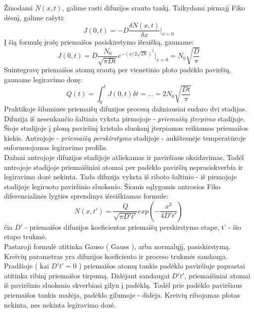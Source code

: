 \documentclass[11pt,a4paper]{article}
\begin{document}
Žinodami $N(x,t)$, galime rasti difuzijos srauto tankį. Taikydami pirmajį Fiko dėsnį, galime rašyti:
\begin{equation} 
J(0,t) = - D\frac{\delta N(x,t)}{\delta x}|_{x=0}
\end{equation}
Į šią formulę įrašę priemaišos pasiskirstymo išraišką, gauname:
\begin{equation}
J(0,t) = D\frac{N_0}{\sqrt{\pi Dt}} e^{-(x/2\sqrt{Dt})^{2}}|_{x=0} = N_0 \sqrt{\frac{D}{\pi}}
\end{equation}
Suintegravę priemaišos atomų srautą per vienetinio ploto padėklo paviršių, gauname legiravimo dozę:
\begin{equation}
Q(t) = \int^{t}_{0}J(0,t)\delta t = ... = 2N_0 \sqrt{\frac{Dt}{\pi}} 
\end{equation}
Praktikoje šiluminės priemaišų difuzijos procesą dažniausiai sudaro dvi stadijas. Difuzija iš nesenkančio šaltinio vyksta pirmojoje - \emph{priemaišų įterpimo} stadijoje. Šioje stadijoje į ploną paviršinį kristalo sluoksnį įterpiamas reikiamas priemaišos kiekis. Antrojoje - \emph{priemaišų perskirstymo} stadijoje - aukštesnėje temperatūroje suformuojamas legiravimo profilis.\\

Dažnai antrojoje difuzijos stadijoje atliekamas ir paviršiaus oksidavimas. Todėl antrojoje stadijoje priemaišiniai atomai per padėklo paviršių neprasiskverbia ir legiravimo dozė nekinta. Tada difuzija vyksta iš riboto šaltinio - iš pirmojoje stadijoje legiruoto paviršinio sluoksnio. Šiomis sąlygomis antrosios Fiko diferencialinės lygties sprendinys išreiškiamas formule:
\begin{equation}
N(x,t') = \frac{Q}{\sqrt{\pi D't'}} exp \left (-\frac{x^2}{4D't'} \right ) 
\end{equation}
čia $D'$ - priemaišos difuzijos koeficientas priemaišų perskirstymo etape, t' - šio etapo trukmė.\\

Pastaroji formulė atitinka Gauso ( Gauss ), arba normalųjį, pasiskirstymą. Kreivių parametras yra difuzijos koeficiento ir proceso trukmės sandauga. Pradžioje ( kai $D't' = 0$ ) priemaišos atomų tankis padėklo paviršiuje paprastai atitinka ribinį priemaišos tirpumą. Didėjant sandaugai $D't'$, priemaišiniai atomai iš paviršinio sluoksnio skverbiasi gilyn į padėklą. Todėl prie padėklo paviršiaus priemaišos tankis mažėja, padėklo gilumoje - didėja. Kreivių ribojamas plotas nekinta, nes nekinta legiravimo dozė.\\
\end{document}
